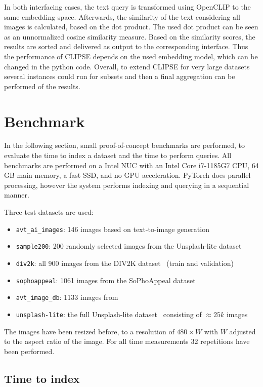 \documentclass{article}
\begin{document}
In both interfacing cases, the text query is transformed using OpenCLIP to the same embedding space.
Afterwards, the similarity of the text considering all images is calculated, based on the dot product.
The used dot product can be seen as an unnormalized cosine similarity measure.
Based on the similarity scores, the results are sorted and delivered as output to the corresponding interface.
Thus the performance of CLIPSE depends on the used embedding model, which can be changed in the python code.
Overall, to extend CLIPSE for very large datasets several instances could run for subsets and then a final aggregation can be performed of the results.

\section{Benchmark}
In the following section, small proof-of-concept benchmarks are performed, to evaluate the time to index a dataset and the time to perform queries.
All benchmarks are performed on a Intel NUC with an Intel Core i7-1185G7 CPU, 64 GB main memory, a fast SSD, and no GPU acceleration.
PyTorch does parallel processing, however the system performs indexing and querying in a sequential manner.

Three test datasets are used:
\begin{itemize}
    \item \texttt{avt\_ai\_images}: 146 images based on text-to-image generation~\cite{goering2023ai,goering2023aiquality}
    \item \texttt{sample200}: 200 randomly selected images from the Unsplash-lite dataset~\cite{unsplash}
    \item \texttt{div2k}: all 900 images from the DIV2K dataset~\cite{agustsson2017ntire} (train and validation)
    \item \texttt{sophoappeal}: 1061 images from the SoPhoAppeal dataset~\cite{goering2023imageappeal}
    \item \texttt{avt\_image\_db}: 1133 images from~\cite{goering2019Intra}
    \item \texttt{unsplash-lite}: the full Unsplash-lite dataset~\cite{unsplash} consisting of $\approx 25k$ images
\end{itemize}

The images have been resized before, to a resolution of $480\times W$ with $W$ adjusted to the aspect ratio of the image.
For all time measurements 32 repetitions have been performed.

\subsection{Time to index}
\end{document}
